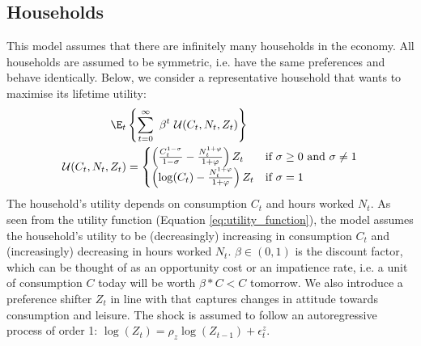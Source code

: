 \subsection{Households}
This model assumes that there are infinitely many households in the economy. All households are assumed to be symmetric, i.e. have the same preferences and behave identically. Below, we consider a representative household that wants to maximise its lifetime utility:
\begin{align}
 \E_t &\left\{\sum^{\infty}_{t=0} \ \beta^t \ \mathcal{U}(C_t, N_t, Z_t)\right\} \label{eq:lifetime_utility}\\
 \mathcal{U}(C_t, N_t, Z_t) &= 
 \begin{cases}
 \left( \frac{C_t^{1-\sigma}}{1-\sigma} - \frac{N_t^{1+\varphi}}{1+\varphi} \right)Z_t & \text{if $\sigma \geq 0$ and $\sigma \ne 1$}\\
 \left( \log(C_t) - \frac{N_t^{1+\varphi}}{1+\varphi} \right)Z_t & \text{if $\sigma = 1$}
 \end{cases}
 \label{eq:utility_function}
\end{align}
The household's utility depends on consumption $C_t$ and hours worked $N_t$. As seen from the utility function (Equation \ref{eq:utility_function}), the model assumes the household's utility to be (decreasingly) increasing in consumption $C_t$ and (increasingly) decreasing in hours worked $N_t$. $\beta \in (0,1)$ is the discount factor, which can be thought of as an opportunity cost or an impatience rate, i.e. a unit of consumption $C$ today will be worth $\beta * C < C$ tomorrow. We also introduce a preference shifter $Z_t$ in line with \textcite[225]{jordigal_2015_monetary} that captures changes in attitude towards consumption and leisure. The shock is assumed to follow an autoregressive process of order 1: $\log (Z_t) = \rho_z \log (Z_{t-1}) + \epsilon^z_{t}$.

